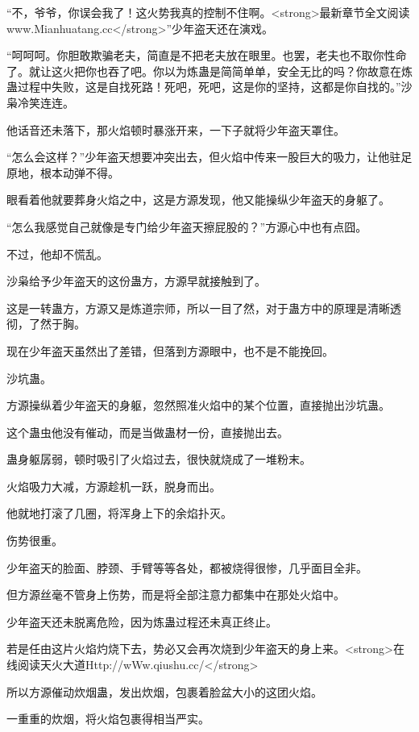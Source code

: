 
\begin{this_body}

“不，爷爷，你误会我了！这火势我真的控制不住啊。<strong>最新章节全文阅读www.Mianhuatang.cc</strong>”少年盗天还在演戏。

“呵呵呵。你胆敢欺骗老夫，简直是不把老夫放在眼里。也罢，老夫也不取你性命了。就让这火把你也吞了吧。你以为炼蛊是简简单单，安全无比的吗？你故意在炼蛊过程中失败，这是自找死路！死吧，死吧，这是你的坚持，这都是你自找的。”沙枭冷笑连连。

他话音还未落下，那火焰顿时暴涨开来，一下子就将少年盗天罩住。

“怎么会这样？”少年盗天想要冲突出去，但火焰中传来一股巨大的吸力，让他驻足原地，根本动弹不得。

眼看着他就要葬身火焰之中，这是方源发现，他又能操纵少年盗天的身躯了。

“怎么我感觉自己就像是专门给少年盗天擦屁股的？”方源心中也有点囧。

不过，他却不慌乱。

沙枭给予少年盗天的这份蛊方，方源早就接触到了。

这是一转蛊方，方源又是炼道宗师，所以一目了然，对于蛊方中的原理是清晰透彻，了然于胸。

现在少年盗天虽然出了差错，但落到方源眼中，也不是不能挽回。

沙坑蛊。

方源操纵着少年盗天的身躯，忽然照准火焰中的某个位置，直接抛出沙坑蛊。

这个蛊虫他没有催动，而是当做蛊材一份，直接抛出去。

蛊身躯孱弱，顿时吸引了火焰过去，很快就烧成了一堆粉末。

火焰吸力大减，方源趁机一跃，脱身而出。

他就地打滚了几圈，将浑身上下的余焰扑灭。

伤势很重。

少年盗天的脸面、脖颈、手臂等等各处，都被烧得很惨，几乎面目全非。

但方源丝毫不管身上伤势，而是将全部注意力都集中在那处火焰中。

少年盗天还未脱离危险，因为炼蛊过程还未真正终止。

若是任由这片火焰灼烧下去，势必又会再次烧到少年盗天的身上来。<strong>在线阅读天火大道Http://wWw.qiushu.cc/</strong>

所以方源催动炊烟蛊，发出炊烟，包裹着脸盆大小的这团火焰。

一重重的炊烟，将火焰包裹得相当严实。


\end{this_body}
